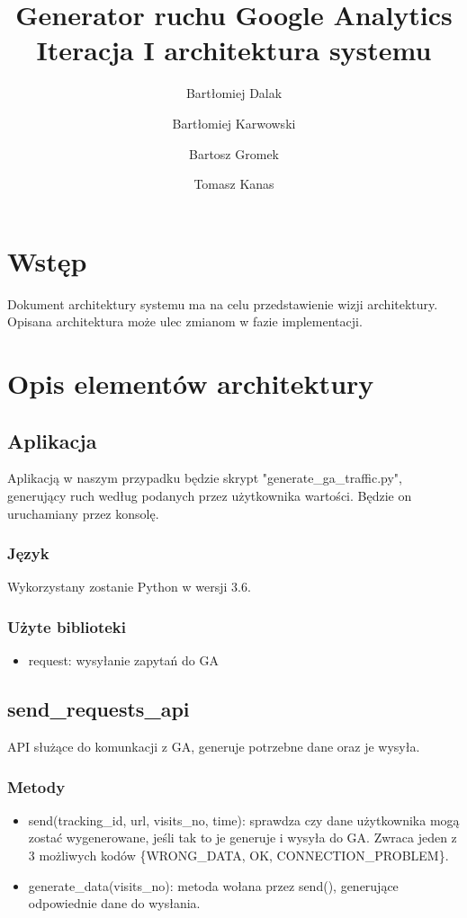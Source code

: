 \documentclass{article}
\title{Generator ruchu Google Analytics \\ Iteracja I architektura systemu}
\author{Bartłomiej Dalak \and Bartłomiej Karwowski \and Bartosz Gromek \and Tomasz Kanas}
\begin{document}
\maketitle

\section{Wstęp}

Dokument architektury systemu ma na celu przedstawienie wizji architektury. Opisana architektura może ulec zmianom w fazie implementacji.

\section{Opis elementów architektury}

\subsection{Aplikacja}

Aplikacją w naszym przypadku będzie skrypt "generate\_ga\_traffic.py", generujący ruch według podanych przez użytkownika wartości. Będzie on uruchamiany przez konsolę.

\subsubsection{Język}

Wykorzystany zostanie Python w wersji 3.6.

\subsubsection{Użyte biblioteki}

\begin{itemize}
\item request: wysyłanie zapytań do GA
\end{itemize}

\subsection{send\_requests\_api}
API służące do komunkacji z GA, generuje potrzebne dane oraz je wysyła.

\subsubsection{Metody}
\begin{itemize}
\item send(tracking\_id, url, visits\_no, time): sprawdza czy dane użytkownika mogą zostać wygenerowane, jeśli tak to je generuje  i wysyła do GA. Zwraca jeden z 3 możliwych kodów \{WRONG\_DATA, OK, CONNECTION\_PROBLEM\}.
\item generate\_data(visits\_no): metoda wołana przez send(), generujące odpowiednie dane do wysłania.
\end{itemize}
\end{document}
